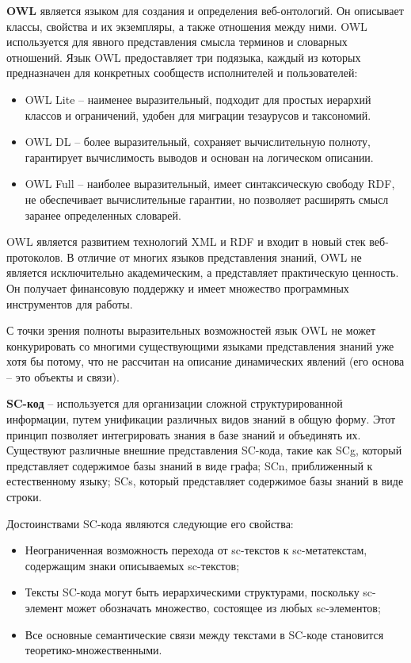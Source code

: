 \textbf{OWL} является языком для создания и определения веб-онтологий. Он описывает классы, свойства и их экземпляры, а также отношения между ними. OWL используется для явного представления смысла терминов и словарных отношений. Язык OWL предоставляет три подязыка, каждый из которых предназначен для конкретных сообществ исполнителей и пользователей:

\begin{itemize}
    \item OWL Lite -- наименее выразительный, подходит для простых иерархий классов и ограничений, удобен для миграции тезаурусов и таксономий.
    \item OWL DL -- более выразительный, сохраняет вычислительную полноту, гарантирует вычислимость выводов и основан на логическом описании.
    \item OWL Full -- наиболее выразительный, имеет синтаксическую свободу RDF, не обеспечивает вычислительные гарантии, но позволяет расширять смысл заранее определенных словарей. \cite{Kursk}
\end{itemize}

OWL является развитием технологий XML и RDF и входит в новый стек веб-протоколов. В отличие от многих языков представления знаний, OWL не является исключительно академическим, а представляет практическую ценность. Он получает финансовую поддержку и имеет множество программных инструментов для работы.

С точки зрения полноты выразительных возможностей язык OWL не может конкурировать со многими существующими языками представления знаний уже хотя бы потому, что не рассчитан на описание динамических явлений (его основа -- это объекты и связи). \cite{Kaftannikov}

\textbf{SC-код} -- используется для организации сложной структурированной информации, путем унификации различных видов знаний в общую форму. Этот принцип позволяет интегрировать знания в базе знаний и объединять их. Существуют различные внешние представления SC-кода, такие как SCg, который представляет содержимое базы знаний в виде графа; SCn, приближенный к естественному языку; SCs, который представляет содержимое базы знаний в виде строки.

Достоинствами SC-кода являются следующие его свойства:
\begin{itemize}
    \item Неограниченная возможность перехода от sc-текстов к sc-метатекстам, содержащим знаки описываемых sc-текстов;
    \item Тексты SC-кода могут быть иерархическими структурами, поскольку sc-элемент может обозначать множество, состоящее из любых sc-элементов;
    \item Все основные семантические связи между текстами в SC-коде становится теоретико-множественными.
\end{itemize}

